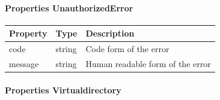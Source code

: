 \documentclass[9pt,]{article}
\let\oldparagraph\paragraph
\renewcommand{\paragraph}[1]{\oldparagraph{#1}\mbox{}}
\begin{document}
\hypertarget{properties-unauthorizederror}{%
\paragraph{Properties
UnauthorizedError}\label{properties-unauthorizederror}}

\begin{longtable}[]{@{}lll@{}}
\toprule
Property & Type & Description\tabularnewline
\midrule
\endhead
code & string & Code form of the error\tabularnewline
message & string & Human readable form of the error\tabularnewline
\bottomrule
\end{longtable}

\hypertarget{properties-virtualdirectory}{%
\paragraph{Properties
Virtualdirectory}\label{properties-virtualdirectory}}
\end{document}
